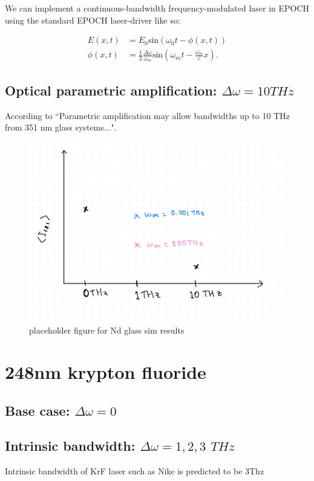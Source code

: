 We can implement a continuous-bandwidth frequency-modulated laser in EPOCH using the standard EPOCH laser-driver like so:

\begin{equation}
\begin{aligned}
   E(x,t) &= E_0\text{sin}\left(\omega_0 t - \phi(x,t)\right) \\
   \phi(x,t) &= \frac{1}{2}\frac{\Delta\omega}{\omega_m}\text{sin}\left(\omega_mt - \frac{\omega_m}{c}x\right).
\end{aligned}
\end{equation}

\subsection{Optical parametric amplification: $\Delta\omega=10\si{THz}$}
According to \citet{Lehmberg2020} ``Parametric amplification may allow bandwidths up to 10 THz from 351 nm glass systems...".


\begin{figure}[ht]
   \centering
    \includegraphics[width=0.75\columnwidth]{Chapters/C5_broadband/ndglass_placeholder.jpeg}
    \caption{placeholder figure for Nd glass sim results}
    \label{fig:NdGlass}
\end{figure}{}

\section{248nm krypton fluoride}\label{sec:248}

\subsection{Base case: $\Delta\omega=0$}

\subsection{Intrinsic bandwidth: $\Delta\omega=1,2,3$ $\si{THz}$}
Intrinsic bandwidth of KrF laser such as Nike is predicted to be 3Thz \citep{Obenschain15}

